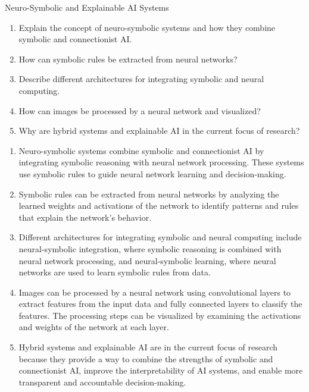 \documentclass{article}
\begin{document}
\begin{exercise}{Neuro-Symbolic and Explainable AI Systems}
  \begin{enumerate}
    \item Explain the concept of neuro-symbolic systems and how they combine symbolic and connectionist AI.
    \item How can symbolic rules be extracted from neural networks?
    \item Describe different architectures for integrating symbolic and neural computing.
    \item How can images be processed by a neural network and visualized?
    \item Why are hybrid systems and explainable AI in the current focus of research?
  \end{enumerate}

  \begin{solution}
    \begin{enumerate}
      \item Neuro-symbolic systems combine symbolic and connectionist AI by integrating symbolic reasoning with neural network processing. These systems use symbolic rules to guide neural network learning and decision-making.
      \item Symbolic rules can be extracted from neural networks by analyzing the learned weights and activations of the network to identify patterns and rules that explain the network's behavior.
      \item Different architectures for integrating symbolic and neural computing include neural-symbolic integration, where symbolic reasoning is combined with neural network processing, and neural-symbolic learning, where neural networks are used to learn symbolic rules from data.
      \item Images can be processed by a neural network using convolutional layers to extract features from the input data and fully connected layers to classify the features. The processing steps can be visualized by examining the activations and weights of the network at each layer.
      \item Hybrid systems and explainable AI are in the current focus of research because they provide a way to combine the strengths of symbolic and connectionist AI, improve the interpretability of AI systems, and enable more transparent and accountable decision-making.
    \end{enumerate}
  \end{solution}
\end{exercise}
\end{document}
